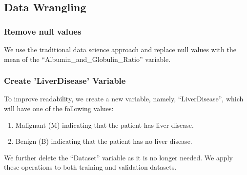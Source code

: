 \documentclass[]{article}
\newenvironment{Shaded}{\begin{snugshade}}{\end{snugshade}}
\newcommand{\CommentTok}[1]{\textcolor[rgb]{0.56,0.35,0.01}{\textit{#1}}}
\newcommand{\DataTypeTok}[1]{\textcolor[rgb]{0.13,0.29,0.53}{#1}}
\newcommand{\KeywordTok}[1]{\textcolor[rgb]{0.13,0.29,0.53}{\textbf{#1}}}
\newcommand{\NormalTok}[1]{#1}
\newcommand{\OperatorTok}[1]{\textcolor[rgb]{0.81,0.36,0.00}{\textbf{#1}}}
\newcommand{\OtherTok}[1]{\textcolor[rgb]{0.56,0.35,0.01}{#1}}
\newcommand{\StringTok}[1]{\textcolor[rgb]{0.31,0.60,0.02}{#1}}
\begin{document}
\subsection{Data Wrangling}
\label{sec:dw}
\subsubsection{Remove null values}

We use the traditional data science approach and replace null values
with the mean of the ``Albumin\_and\_Globulin\_Ratio'' variable.

\begin{Shaded}
\end{Shaded}

\subsubsection{Create 'LiverDisease' Variable}

To improve readability, we create a new variable, namely,
``LiverDisease'', which will have one of the following values:

\begin{enumerate}
\item Malignant (M) indicating that the patient has liver disease.
\item Benign (B) indicating that the patient has no liver disease.
\end{enumerate}

We further delete the ``Dataset'' variable as it is no longer needed. We
apply these operations to both training and validation datasets.
\end{document}
